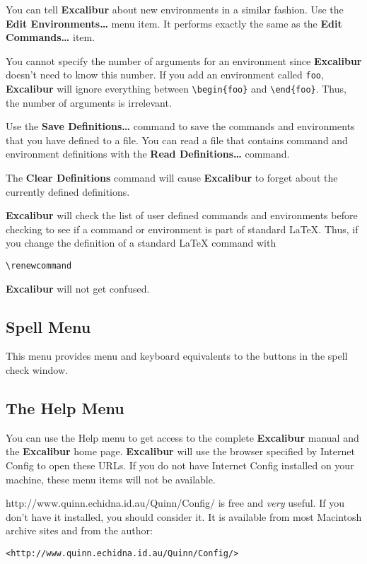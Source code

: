 \documentclass[11pt,titlepage]{article}
\newcommand{\ex}{\textbf{Excalibur}}
\begin{document}
You can tell \ex{} about new environments in a similar fashion.  Use
the \textbf{Edit Environments\ldots} menu item.  It performs exactly
the same as the \textbf{Edit Commands\ldots} item.

You cannot specify the number of arguments for an environment since
\ex{} doesn't need to know this number.  If you add an environment
called \texttt{foo}, \ex{} will ignore everything between
\verb+\begin{foo}+ and \verb+\end{foo}+.  Thus, the number of
arguments is irrelevant.

Use the \textbf{Save Definitions\ldots} command to save the commands
and environments that you have defined to a file.  You can read a file
that contains command and environment definitions with the
\textbf{Read Definitions\ldots} command.

The \textbf{Clear Definitions} command will cause \ex{} to forget
about the currently defined definitions.

\ex{} will check the list of user defined commands and environments before
checking to see if a command or environment is part of standard
\LaTeX.  Thus, if you change the definition of a standard \LaTeX
command with
\begin{verbatim}
\renewcommand
\end{verbatim}
\ex{} will not get confused.

\subsection{Spell Menu}

This menu provides menu and keyboard equivalents to the buttons in the
spell check window.

\subsection{The Help Menu}

You can use the Help menu to get access to the complete \ex{} manual
and the \ex{} home page.  \ex{} will use the browser specified by
Internet Config to open these URLs.  If you do not have Internet
Config installed on your machine, these menu items will not be
available.

{http://www.quinn.echidna.id.au/Quinn/Config/} is free and \emph{very}
useful.  If you don't have it installed, you should consider it.  It
is available from most Macintosh archive sites and from the author:
\begin{verbatim}
<http://www.quinn.echidna.id.au/Quinn/Config/>
\end{verbatim}
\end{document}
